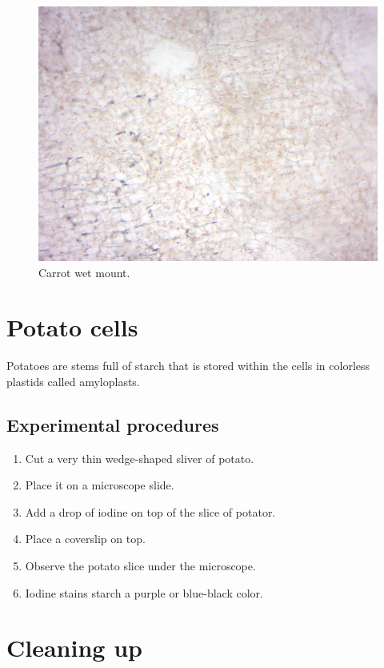 \begin{figure}

{\centering \includegraphics[width=0.7\linewidth]{./figures/cell_struc/carot} 

}

\caption{Carrot wet mount.}\label{fig:carot}
\end{figure}

\section{Potato cells}\label{potato-cells}

Potatoes are stems full of starch that is stored within the cells in
colorless plastids called amyloplasts.

\subsection{Experimental procedures}\label{experimental-procedures-10}

\begin{enumerate}
\def\labelenumi{\arabic{enumi}.}
\tightlist
\item
  Cut a very thin wedge-shaped sliver of potato.
\item
  Place it on a microscope slide.
\item
  Add a drop of iodine on top of the slice of potator.
\item
  Place a coverslip on top.
\item
  Observe the potato slice under the microscope.
\item
  Iodine stains starch a purple or blue-black color.
\end{enumerate}

\section{Cleaning up}\label{cleaning-up-3}

